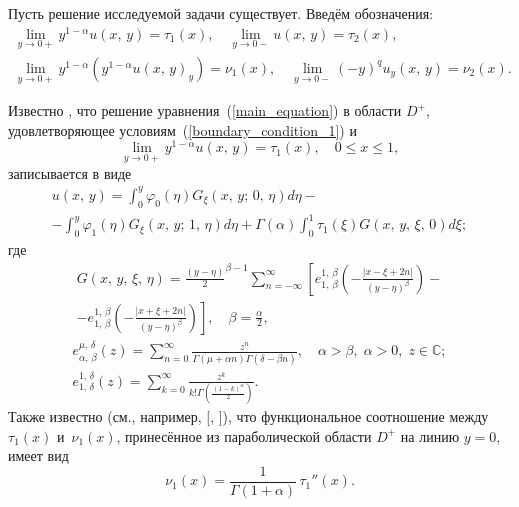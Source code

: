 Пусть решение исследуемой задачи существует. Введём  обозначения:
\begin{gather*}
  \lim\limits_{y\rightarrow0+}y^{1-\alpha}u(x,\,y)=\tau_1(x),\quad \lim\limits_{y\rightarrow0-}u(x,\,y)=\tau_2(x),
\\
  \lim\limits_{y\rightarrow0+}y^{1-\alpha}\left(y^{1-\alpha}u(x,\,y)_y\right)=\nu_1(x),\quad \lim\limits_{y\rightarrow0-}(-y)^{q}u_y(x,\,y)=\nu_2(x).
\end{gather*}

Известно \cite[c.~108]{sayg:P}, что решение уравнения~(\ref{main_equation}) в области $D^+$, удовлетворяющее условиям~(\ref{boundary_condition_1}) и
\begin{equation*}%
  \lim\limits_{y\rightarrow0+}y^{1-\alpha}u(x,\,y)=\tau_1(x), \quad 0\leqslant x\leqslant1,
\end{equation*}
записывается в виде
\begin{multline}\label{solution}
  u(x,\,y)=\int_0^y\varphi_0(\eta)G_{\xi}(x,\,y;\,0,\,\eta)d\eta-\\
           -\int_0^y\varphi_1(\eta)G_{\xi}(x,\,y;\,1,\,\eta)d\eta+\Gamma(\alpha)\int_0^1\tau_1(\xi)G(x,\,y,\,\xi,\,0)d\xi;
\end{multline}
где
\begin{multline*}
  G(x,\,y,\, \xi,\,\eta)=\frac{(y-\eta)}{2}^{\beta-1}\sum_{n=-\infty}^{\infty}\left[e_{1,\,\beta}^{1,\,\beta}\left(-\frac{|x-\xi+2n|}{(y-\eta)^{\beta}}\right)-\right.\\
                         \left.-e_{1,\,\beta}^{1,\,\beta}\left(-\frac{|x+\xi+2n|}{(y-\eta)^{\beta}}\right)\right],\quad \beta=\frac{\alpha}{2},
\end{multline*}
\begin{gather*}
    e_{\alpha,\,\beta}^{\mu,\,\delta}(z)=\sum_{n=0}^{\infty}\frac{z^n}{\Gamma(\mu+\alpha n)\Gamma(\delta-\beta n)},\quad \alpha>\beta,\; \alpha>0,\; z\in \mathbb{C};
\\
    e_{1,\,\delta}^{1,\,\delta}(z)=\sum_{k=0}^{\infty}\frac{z^k}{k!\Gamma\left(\frac{(1-k)^{\alpha}}{2}\right)}.
\end{gather*}
Также известно (см., например, [, ]), что функциональное соотношение между $\tau_1(x)$ и~$\nu_1(x)$, принесённое из параболической области $D^+$ на линию $y=0$, имеет вид
\begin{equation}\label{function_relation_1}
    \nu_1(x)=\frac{1}{\Gamma(1+\alpha)}\,\tau_1''(x).
\end{equation}

